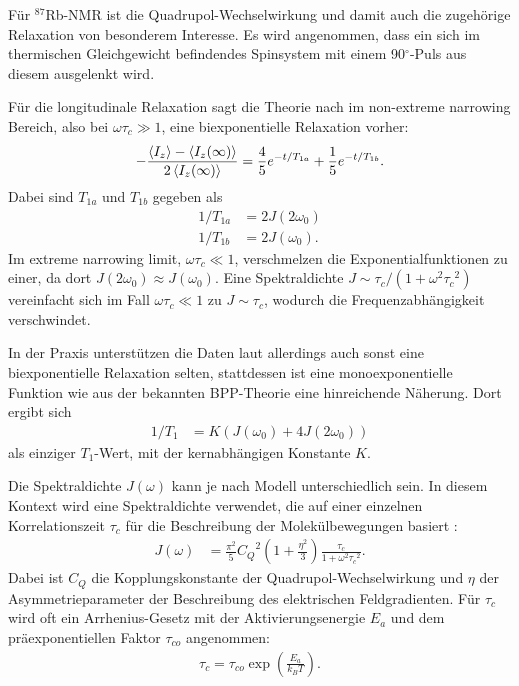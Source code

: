 Für $^{87}$Rb-NMR ist die Quadrupol-Wechselwirkung und damit auch die zugehörige Relaxation von besonderem Interesse. Es wird angenommen, dass ein sich im thermischen Gleichgewicht befindendes Spinsystem mit einem 90$^\circ$-Puls aus diesem ausgelenkt wird.

Für die longitudinale Relaxation sagt die Theorie nach \cite{hubbard} im non-extreme narrowing Bereich, also bei $\omega \tau_c \gg 1$, eine biexponentielle Relaxation vorher:
\begin{align}
    - \frac{\Braket{I_z} - \Braket{I_z(\infty)}}{2\Braket{I_z(\infty)}} = \frac{4}{5}e^{-t/T_{1a}} + \frac{1}{5}e^{-t/T_{1b}}.
\end{align}
Dabei sind $T_{1a}$ und $T_{1b}$ gegeben als
\begin{align}
    1/T_{1a} &= 2J(2\omega_0) \\
    1/T_{1b} &= 2J(\omega_0).
\end{align}
Im extreme narrowing limit, $\omega \tau_c \ll 1$, verschmelzen die Exponentialfunktionen zu einer, da dort $J(2\omega_0) \approx J(\omega_0)$. Eine Spektraldichte $J \sim \tau_c / (1 + \omega^2 {\tau_c}^2)$ vereinfacht sich im Fall $\omega \tau_c \ll 1$ zu $J \sim \tau_c$, wodurch die Frequenzabhängigkeit verschwindet.

In der Praxis unterstützen die Daten laut \cite{eckert} allerdings auch sonst eine biexponentielle Relaxation selten, stattdessen ist eine monoexponentielle Funktion wie aus der bekannten BPP-Theorie \cite{bpp} eine hinreichende Näherung. Dort ergibt sich
\begin{align}
    1/T_1 &= K (J(\omega_0) + 4J(2\omega_0)) \label{eqn:bpp}
\end{align}
als einziger $T_1$-Wert, mit der kernabhängigen Konstante $K$.

Die Spektraldichte $J(\omega)$ kann je nach Modell unterschiedlich sein. In diesem Kontext wird eine Spektraldichte verwendet, die auf einer einzelnen Korrelationszeit $\tau_c$ für die Beschreibung der Molekülbewegungen basiert \cite{eckert}:
\begin{align}
    J(\omega) &= \frac{\pi^2}{5} {C_Q}^2 \left( 1 + \frac{\eta^2}{3} \right) \frac{\tau_c}{1 + \omega^2 {\tau_c}^2}. \label{eqn:spektraldichte_j}
\end{align}
Dabei ist $C_Q$ die Kopplungskonstante der Quadrupol-Wechselwirkung und $\eta$ der Asymmetrieparameter der Beschreibung des elektrischen Feldgradienten. Für $\tau_c$ wird oft ein Arrhenius-Gesetz mit der Aktivierungsenergie $E_a$ und dem präexponentiellen Faktor $\tau_{co}$ angenommen:
\begin{align}
    \tau_c = \tau_{co} \exp \left( \frac{E_a}{k_B T} \right).
\end{align}


